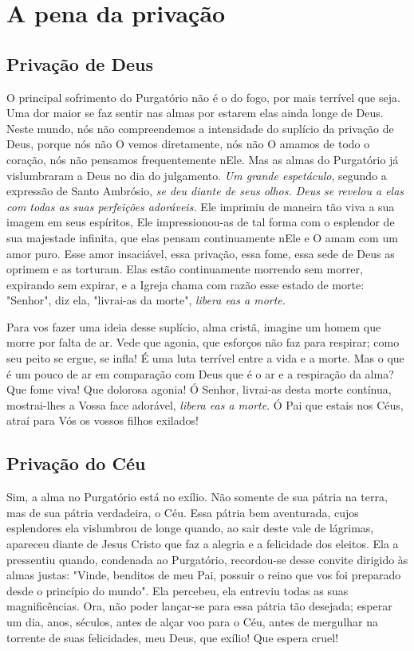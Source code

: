 \renewcommand{\thechapterdisplay}{Sexto dia}
\renewcommand{\thechapterrunner}{A pena da privação}
\chapter[Sexto dia --- A pena da privação]{A pena da privação}
\section*{Privação de Deus}

O principal sofrimento do Purgatório não é o do fogo, por mais terrível que seja. Uma dor maior se faz sentir nas almas por estarem elas ainda longe de Deus. Neste mundo, nós não compreendemos a intensidade do suplício da privação de Deus, porque nós não O vemos diretamente, nós não O amamos de todo o coração, nós não pensamos frequentemente nEle. Mas as almas do Purgatório já vislumbraram a Deus no dia do julgamento. \textit{Um grande espetáculo}, segundo a expressão de Santo Ambrósio, \textit{se deu diante de seus olhos. Deus se revelou a elas com todas as suas perfeições adoráveis.} Ele imprimiu de maneira tão viva a sua imagem em seus espíritos, Ele impressionou-as de tal forma com o esplendor de sua majestade infinita, que elas pensam continuamente nEle e O amam com um amor puro. Esse amor insaciável, essa privação, essa fome, essa sede de Deus as oprimem e as torturam. Elas estão continuamente morrendo sem morrer, expirando sem expirar, e a Igreja chama com razão esse estado de morte: "Senhor", diz ela, "livrai-as da morte", \textit{libera eas a morte.}

Para vos fazer uma ideia desse suplício, alma cristã, imagine um homem que morre por falta de ar. Vede que agonia, que esforços não faz para respirar; como seu peito se ergue, se infla! É uma luta terrível entre a vida e a morte. Mas o que é um pouco de ar em comparação com Deus que é o ar e a respiração da alma? Que fome viva! Que dolorosa agonia! Ó Senhor, livrai-as desta morte contínua, mostrai-lhes a Vossa face adorável, \textit{libera eas a morte}. Ó Pai que estais nos Céus, atraí para Vós os vossos filhos exilados!


\section*{Privação do Céu}

Sim, a alma no Purgatório está no exílio. Não somente de sua pátria na terra, mas de sua pátria verdadeira, o Céu. Essa pátria bem aventurada, cujos esplendores ela vislumbrou de longe quando, ao sair deste vale de lágrimas, apareceu diante de Jesus Cristo que faz a alegria e a felicidade dos eleitos. Ela a pressentiu quando, condenada ao Purgatório, recordou-se desse convite dirigido às almas justas: "Vinde, benditos de meu Pai, possuir o reino que vos foi preparado desde o princípio do mundo". Ela percebeu, ela entreviu todas as suas magnificências. Ora, não poder lançar-se para essa pátria tão desejada; esperar um dia, anos, séculos, antes de alçar voo para o Céu, antes de mergulhar na torrente de suas felicidades, meu Deus, que exílio! Que espera cruel!

